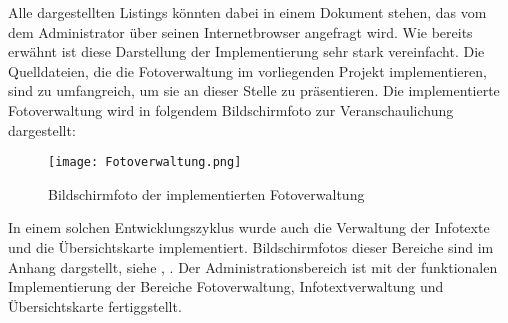 

Alle dargestellten Listings könnten dabei in einem Dokument stehen, das vom dem Administrator über seinen Internetbrowser angefragt wird.
Wie bereits erwähnt ist diese Darstellung der Implementierung sehr stark vereinfacht. Die Quelldateien, die die Fotoverwaltung im vorliegenden Projekt implementieren, sind zu umfangreich, um sie an dieser Stelle zu präsentieren. Die implementierte Fotoverwaltung wird in folgendem Bildschirmfoto zur Veranschaulichung dargestellt:

\begin{figure}[htb]
\centering
\texttt{[image: Fotoverwaltung.png]}
\caption[Fotoverwaltung]{Bildschirmfoto der implementierten Fotoverwaltung}
\label{fig:Fotoverwaltung}
\end{figure}

In einem solchen Entwicklungszyklus wurde auch die Verwaltung der Infotexte und die Übersichtskarte implementiert. Bildschirmfotos dieser Bereiche sind im Anhang dargstellt, siehe , . Der Administrationsbereich ist mit der funktionalen Implementierung der Bereiche Fotoverwaltung, Infotextverwaltung und Übersichtskarte fertiggstellt.